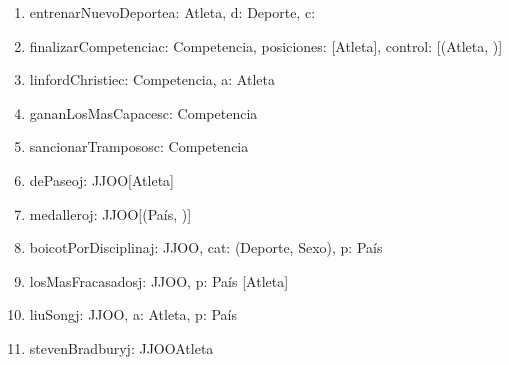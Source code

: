 \documentclass[a4paper]{article}
\begin{document}
\begin{enumerate}

\item
\begin{problema}{entrenarNuevoDeporte}{a: Atleta, d: Deporte, c: \ent}{}
\end{problema}

\item
\begin{problema}{finalizarCompetencia}{c: Competencia, posiciones: [Atleta], control: [(Atleta, \bool)]}{}
\end{problema}

\item
\begin{problema}{linfordChristie}{c: Competencia, a: Atleta}{}
\end{problema}

\item
\begin{problema}{gananLosMasCapaces}{c: Competencia}{\bool}
\end{problema}

\item
\begin{problema}{sancionarTramposos}{c: Competencia}{}
\end{problema}

\item
\begin{problema}{dePaseo}{j: JJOO}{[Atleta]} 
\end{problema}

\item
\begin{problema}{medallero}{j: JJOO}{[(Pa\'{i}s, \ent)]}
\end{problema}

\item
\begin{problema}{boicotPorDisciplina}{j: JJOO, cat: (Deporte, Sexo), p: Pa\'{i}s }{\ent}
\end{problema}

\item
\begin{problema}{losMasFracasados}{j: JJOO, p: Pa\'{i}s }{[Atleta]}
\end{problema}

\item
\begin{problema}{liuSong}{j: JJOO, a: Atleta, p: Pa\'{i}s }{}
\end{problema}

\item
\begin{problema}{stevenBradbury}{j: JJOO}{Atleta}
\end{problema}


\end{enumerate}
\end{document}
